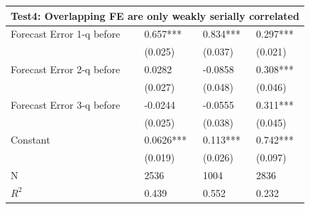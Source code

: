 \documentclass[]{article}
\begin{document}
\begin{table}[]
\begin{tabular}{llll}
	\hline 
	\multicolumn{4}{l}{Test4: Overlapping FE are only weakly serially correlated}                          \\
	\hline 
	Forecast Error 1-q before           & 0.657***         & 0.834***         & 0.297***       \\
	& (0.025)          & (0.037)          & (0.021)        \\
	Forecast Error 2-q before           & 0.0282           & -0.0858          & 0.308***       \\
	& (0.027)          & (0.048)          & (0.046)        \\
	Forecast Error 3-q before           & -0.0244          & -0.0555          & 0.311***       \\
	& (0.025)          & (0.038)          & (0.045)        \\
	Constant                            & 0.0626***        & 0.113***         & 0.742***       \\
	& (0.019)          & (0.026)          & (0.097)        \\
	\hline 
	N                                   & 2536             & 1004             & 2836           \\
	$R^2$                & 0.439            & 0.552            & 0.232    \\
	\hline      
\end{tabular}
\end{table}

\newpage 
\end{document}
